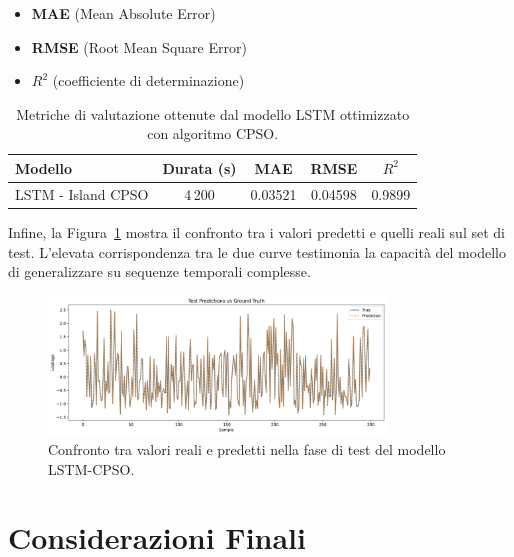 \documentclass{article}
\begin{document}
\vspace{0.5em}
\begin{itemize}
    \item \textbf{MAE} (Mean Absolute Error)
    \item \textbf{RMSE} (Root Mean Square Error)
    \item \textbf{$R^2$} (coefficiente di determinazione)
\end{itemize}
\vspace{0.5em}

\begin{table}[H]
    \centering
    \renewcommand{\arraystretch}{1.2}
    \begin{tabular}{lcccc}
        \toprule
        \textbf{Modello} & \textbf{Durata (s)} & \textbf{MAE} & \textbf{RMSE} & \boldmath$R^2$ \\
        \midrule
        LSTM - Island CPSO & 4\,200 & 0.03521 & 0.04598 & 0.9899 \\
        \bottomrule
    \end{tabular}
    \caption{Metriche di valutazione ottenute dal modello LSTM ottimizzato con algoritmo CPSO.}
    \label{tab:Result_LSTM_CPSO}
\end{table}

Infine, la Figura~\ref{fig:test_predict} mostra il confronto tra i valori predetti e quelli reali 
sul set di test. L’elevata corrispondenza tra le due curve testimonia la capacità del modello di 
generalizzare su sequenze temporali complesse.

\begin{figure}[H]
    \centering
    \includegraphics[width=0.8\textwidth]{img/Test Predict.png}
    \caption{Confronto tra valori reali e predetti nella fase di test del modello LSTM-CPSO.}
    \label{fig:test_predict}
\end{figure}

\section{Considerazioni Finali}
\end{document}
